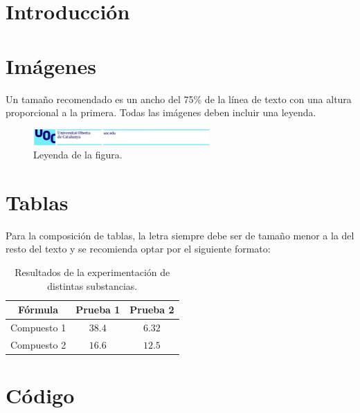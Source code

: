 \documentclass[11pt]{article}
\begin{document}
\portada

\section{Introducción}

\lipsum[1-5]

\section{Imágenes}

Un tamaño recomendado es un ancho del 75\% de la línea de texto con una altura proporcional a la primera. Todas las imágenes deben incluir una leyenda.

\begin{figure}[H]
    \centering
    \includegraphics[width=0.60\textwidth]{Figuras/encabezado.png}
    \caption{Leyenda de la figura.}
    \label{fig:etiqueta de la figura}
\end{figure}


\section{Tablas}

Para la composición de tablas, la letra siempre debe ser de tamaño menor a la del resto del texto y se recomienda optar por el siguiente formato:

\begin{table}[H]
    \centering\small
    \begin{tabular}{ccc}
    \toprule
        \textbf{Fórmula} & \textbf{Prueba 1} & \textbf{Prueba 2} \\ 
    \midrule
        Compuesto 1 & $38.4$  &  $6.32$\\ 
        Compuesto 2 & $16.6$ & $12.5$ \\ 
    \bottomrule
    \end{tabular}
    \label{tab:01}
    \caption{Resultados de la experimentación de distintas substancias.}
\end{table}


\section{Código}
\end{document}
